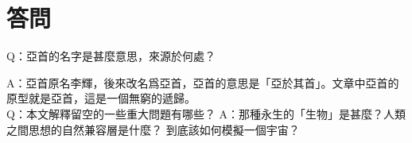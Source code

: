 \chapter*{答問}



Q：亞首的名字是甚麼意思，來源於何處？

A：亞首原名李輝，後來改名爲亞首，亞首的意思是「亞於其首」。文章中亞首的原型就是亞首，這是一個無窮的遞歸。
\\

Q：本文解釋留空的一些重大問題有哪些？
A：那種永生的「生物」是甚麼？人類之間思想的自然兼容層是什麼？ 到底該如何模擬一個宇宙？%


